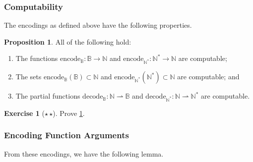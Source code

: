 \documentclass[11pt,a4paper,reqno]{amsart}
\theoremstyle{plain}
\theoremstyle{definition}
\newtheorem{proposition}[theorem]{Proposition}
\theoremstyle{definition}
\newtheorem{exercise}[theorem]{Exercise}
\newcommand\exerciseLevelMedium{$\star${\,}$\star$}
\begin{document}
\subsubsection{Computability}

The encodings as defined above have the following properties.

\begin{proposition}\label{prop:encodeing-as-nats}
	All of the following hold:
	\begin{enumerate}
		\item The functions $\mathrm{encode}_{\mathbb B}\colon \mathbb B\to\mathbb N$ and $\mathrm{encode}_{\mathbb N^*}\colon\mathbb N^*\to\mathbb N$ are computable;
		\item The sets $\mathrm{encode}_{\mathbb B}(\mathbb B)\subset \mathbb N$ and $\mathrm{encode}_{\mathbb N^*}(\mathbb N^*)\subset \mathbb N$ are computable; and
		\item The partial functions $\mathrm{decode}_{\mathbb B}\colon \mathbb N\rightharpoonup\mathbb B$ and $\mathrm{decode}_{\mathbb N^*}\colon \mathbb N \rightharpoonup \mathbb N^*$ are computable.
	\end{enumerate}
\end{proposition}

\begin{exercise}[\exerciseLevelMedium]
	Prove \cref{prop:encodeing-as-nats}.
\end{exercise}

\subsubsection{Encoding Function Arguments}

From these encodings, we have the following lemma.
\end{document}
